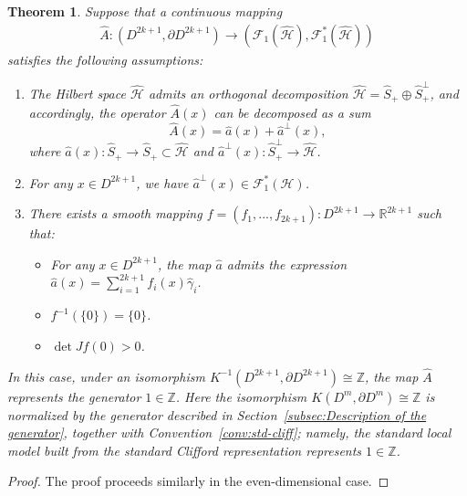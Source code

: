 \documentclass{amsart}
\newtheorem{thm}{Theorem}[section]
\theoremstyle{definition}
\theoremstyle{remark}
\begin{document}
\begin{thm}\label{thm:4.11}
Suppose that a continuous mapping 
\begin{align*}
\hat{A}\colon(D^{2k+1},\partial D^{2k+1})\to (\mathcal{F}_{1}(\mathcal{\hat{H}}),\mathcal{F}^{*}_{1}(\mathcal{\hat{H}}))
 \end{align*}
 satisfies the following assumptions:
\begin{enumerate}
\item The Hilbert space \( \hat{\mathcal{H}} \) admits an orthogonal decomposition 
\( \hat{\mathcal{H}} = \hat{S}_{+} \oplus \hat{S}_{+}^{\perp} \), and accordingly, 
the operator \( \hat{A}(x) \) can be decomposed as a sum 
\[
\hat{A}(x) = \hat{a}(x) + \hat{a}^{\perp}(x),
\]
where \( \hat{a}(x) \colon \hat{S}_{+} \to \hat{S}_{+} \subset \hat{\mathcal{H}} \) 
and \( \hat{a}^{\perp}(x) \colon \hat{S}_{+}^{\perp} \to \hat{\mathcal{H}} \).\\
\item For any $x \in D^{2k+1}$, we have $\hat{a}^{\perp}(x)\in \mathcal{F}^{*}_{1}(\mathcal{\mathcal{H}})$.\\
\item There exists a smooth mapping $f=(f_1,...,f_{2k+1})\colon D^{2k+1}\to \mathbb{R}^{2k+1}$ such that:
\begin{itemize}
    \item  For any $x \in D^{2k+1}$, the map $\hat{a}$ admits the expression $\hat{a}(x)=\sum_{i=1}^{2k+1}f_i(x)\hat{\gamma}_i$.
    \item $f^{-1}(\{0\})=\{0\}$.
    \item $\det Jf(0)>0$.
\end{itemize}
\end{enumerate}
In this case, under an isomorphism $K^{-1}(D^{2k+1},\partial D^{2k+1})\cong \mathbb{Z}$, the map $\hat{A}$ represents the generator $1 \in \mathbb{Z}$. Here the isomorphism $K(D^{m},\partial D^{m})\cong \mathbb{Z}$ is normalized by the generator described in Section~\ref{subsec:Description of the generator}, together with Convention~\ref{conv:std-cliff}; namely, the standard local model built from the standard Clifford representation represents $1\in\mathbb{Z}$.
\end{thm}

\begin{proof}
The proof proceeds similarly in the even-dimensional case.
\end{proof}                                                 
\end{document}

